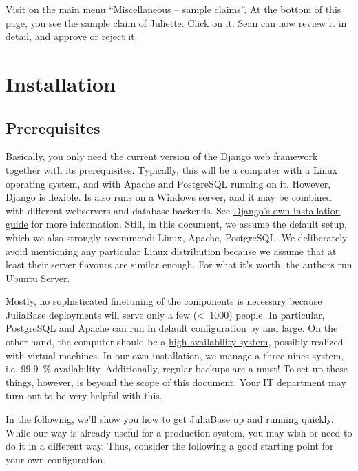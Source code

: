 \documentclass[a4paper,11pt,english]{sphinxmanual}
\begin{document}
Visit on the main menu “Miscellaneous – sample claims”.  At the bottom of this
page, you see the sample claim of Juliette.  Click on it.  Sean can now review
it in detail, and approve or reject it.


\chapter{Installation}
\label{programming/installation:index-0}\label{programming/installation::doc}\label{programming/installation:installation}

\section{Prerequisites}
\label{programming/installation:prerequisites}\label{programming/installation:index-1}
Basically, you only need the current version of the \href{https://www.djangoproject.com/}{Django web framework}
together with its prerequisites.  Typically, this will be a computer with a
Linux operating system, and with Apache and PostgreSQL running on it.  However,
Django is flexible.  Is also runs on a Windows server, and it may be combined
with different webservers and database backends.  See \href{https://docs.djangoproject.com/en/1.7/topics/install/}{Django's own
installation guide} for more information.  Still, in this document, we assume
the default setup, which we also strongly recommend: Linux, Apache, PostgreSQL.
We deliberately avoid mentioning any particular Linux distribution because we
assume that at least their server flavours are similar enough.  For what it's
worth, the authors run Ubuntu Server.

Mostly, no sophisticated finetuning of the components is necessary because
JuliaBase deployments will serve only a few (\textless{} 1000) people.  In particular,
PostgreSQL and Apache can run in default configuration by and large.  On the
other hand, the computer should be a \href{http://linux-ha.org/}{high-availability system}, possibly
realized with virtual machines.  In our own installation, we manage a
three-nines system, i.e. 99.9 \% availability.  Additionally, regular backups
are a must! To set up these things, however, is beyond the scope of this
document.  Your IT department may turn out to be very helpful with this.

In the following, we'll show you how to get JuliaBase up and running quickly.
While our way is already useful for a production system, you may wish or need
to do it in a different way.  Thus, consider the following a good starting
point for your own configuration.
\end{document}
